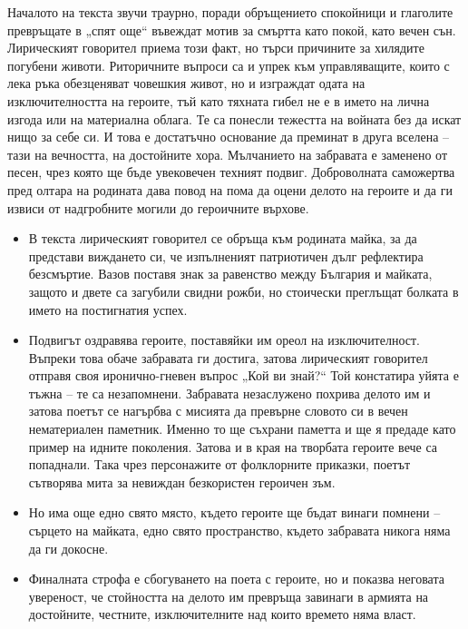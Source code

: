 \documentclass[12pt,a4paper]{article}
\begin{document}
\indent Началото на текста звучи траурно, поради обръщението спокойници и глаголите превръщате в „спят още“ въвеждат мотив за смъртта като покой, като вечен сън. Лирическият говорител приема този факт, но търси причините за хилядите погубени животи. Риторичните въпроси са и упрек към управляващите, които с лека ръка обезценяват човешкия живот, но и изграждат одата на изключителността на героите, тъй като тяхната гибел не е в името на лична изгода или на материална облага. Те са понесли тежестта на войната без да искат нищо за себе си. И това е достатъчно основание да преминат в друга вселена – тази на вечността, на достойните хора. Мълчанието на забравата е заменено от песен, чрез която ще бъде увековечен техният подвиг. Доброволната саможертва пред олтара на родината дава повод на пома да оцени делото на героите и да ги извиси от надгробните могили до героичните върхове.

\vspace{0.1cm}
\begin{itemize}[leftmargin=*, noitemsep, topsep=2pt, parsep=0pt]
    \item В текста лирическият говорител се обръща към родината майка, за да представи виждането си, че изпълненият патриотичен дълг рефлектира безсмъртие. Вазов поставя знак за равенство между България и майката, защото и двете са загубили свидни рожби, но стоически преглъщат болката в името на постигнатия успех.
    \vspace{0.1cm}
    \item Подвигът оздравява героите, поставяйки им ореол на изключителност. Въпреки това обаче забравата ги достига, затова лирическият говорител отправя своя иронично-гневен въпрос „Кой ви знай?“ Той констатира уйята е тъжна – те са незапомнени. Забравата незаслужено похрива делото им и затова поетът се нагърбва с мисията да превърне словото си в вечен нематериален паметник. Именно то ще съхрани паметта и ще я предаде като пример на идните поколения. Затова и в края на творбата героите вече са попаднали. Така чрез персонажите от фолклорните приказки, поетът сътворява мита за невиждан безкористен героичен зъм.
    \vspace{0.1cm}
    \item Но има още едно свято място, където героите ще бъдат винаги помнени – сърцето на майката, едно свято пространство, където забравата никога няма да ги докосне.
    \vspace{0.1cm}
    \item Финалната строфа е сбогуването на поета с героите, но и показва неговата увереност, че стойността на делото им превръща завинаги в армията на достойните, честните, изключителните над които времето няма власт.
\end{itemize}
\end{document}

